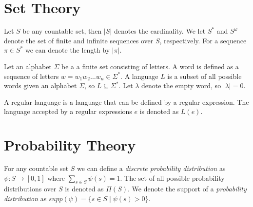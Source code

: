 \section*{Set Theory}
Let $S$ be any countable set, then $|S|$ denotes the cardinality. We let $S^*$ and $S^\omega$ denote the set of finite and infinite sequences over $S$, respectively. For a sequence $\pi\in S^*$ we can denote the length by $|\pi|$.

Let an alphabet $\Sigma$ be a a finite set consisting of letters. A word is defined as a sequence of letters $w=w_1 w_2\dots w_n\in \Sigma^*$. A language $L$ is a subset of all possible words given an alphabet $\Sigma$, so $L\subseteq \Sigma^*$. Let $\lambda$ denote the empty word, so $|\lambda|=0$.

A regular language is a language that can be defined by a regular expression. The language accepted by a regular expressions $e$ is denoted as $L(e)$.



\section*{Probability Theory}
For any countable set $S$ we can define a \textit{discrete probability distribution} as $\psi: S\to[0,1]$ where $\sum\limits_{s\in S} \psi(s)=1$. The set of all possible probability distributions over $S$ is denoted as $\Pi(S)$. We denote the support of a \textit{probability distribution} as $supp(\psi)=\{s\in S\mid \psi(s)>0\}$.\\


	


